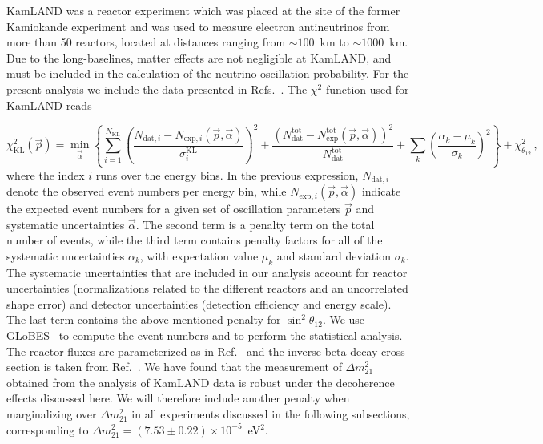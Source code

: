 \documentclass[aps, prd, onecolumn, tightenlines, notitlepage, superscriptaddress, nofootinbib, preprintnumbers, floatfix,showkeys,11pt]{revtex4-2}
\begin{document}
KamLAND was a reactor experiment which was placed at the site of the former Kamiokande experiment and was used to measure electron antineutrinos from more than 50 reactors, located at distances ranging from $\sim100$~km to $\sim1000$~km. 
%
Due to the long-baselines, matter effects are not negligible at KamLAND, and must be included in the calculation of the neutrino oscillation probability.
%
For the present analysis we include the data presented in Refs.~\cite{Gando:2010aa,kamland_web}.
%
The $\chi^2$ function used for KamLAND reads

\begin{equation}
 \chi^2_\text{KL}(\vec{p}) = \min_{\vec{\alpha}}\left\{\sum_{i=1}^{N_\text{KL}}\left(\frac{N_{\text{dat},i} - N_{\text{exp},i}(\vec{p},\vec{\alpha})}{\sigma^\text{KL}_i}\right)^2 + \frac{(N^{\text{tot}}_{\text{dat}} - N^{\text{tot}}_{\text{exp}}(\vec{p},\vec{\alpha}))^2}{N^{\text{tot}}_{\text{dat}}}
+ 
 \sum_k \left(\frac{\alpha_k - \mu_k}{\sigma_k} \right)^2\right\}+\chi^2_{\theta_{12}}\,,
\end{equation}
where the index $i$ runs over the energy bins.
%
In the previous expression, $N_{\text{dat},i}$ denote the observed event numbers per energy bin, while $N_{\text{exp},i}(\vec{p},\vec{\alpha})$ indicate the expected event numbers for a given set of oscillation parameters $\vec{p}$ and systematic uncertainties $\vec{\alpha}$.
%
The second term is a penalty term on the total number of events, 
while the third term contains penalty factors for all of the systematic uncertainties $\alpha_k$, with expectation value $\mu_k$ and standard deviation $\sigma_k$. 
%
The systematic uncertainties that are included in our analysis account for reactor uncertainties (normalizations related to the different reactors and an uncorrelated shape error) and detector uncertainties (detection efficiency and energy scale). The last term contains the above mentioned penalty for $\sin^2\theta_{12}$.
%
We use GLoBES~\cite{Huber:2004ka,Huber:2007ji} to compute the event numbers and to perform the statistical analysis.
%
The reactor fluxes are parameterized as in Ref.~\cite{Huber:2004xh} and the inverse beta-decay cross section is taken from Ref.~\cite{Vogel:1999zy}. 
%
We have found that the measurement of $\Delta m_{21}^2$ obtained from the analysis of KamLAND data is robust under the decoherence effects discussed here. We will therefore include another penalty when marginalizing over $\Delta m_{21}^2$ in all experiments discussed in the following subsections, corresponding to $\Delta m_{21}^2 = (7.53\pm0.22)\times10^{-5}$~eV$^2$.\\
\end{document}
